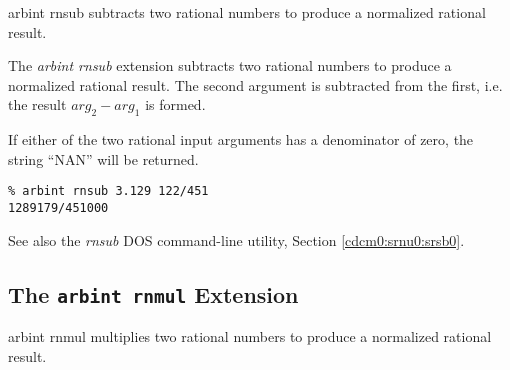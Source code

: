 \begin{tclcommandname}{arbint rnsub}%
subtracts two rational numbers to produce a normalized rational result.
\end{tclcommandname}

\begin{tclcommandsynopsis}
\end{tclcommandsynopsis}

\begin{tclcommanddescription}
The \emph{arbint rnsub} extension subtracts two rational numbers to produce a 
normalized rational result.  The second argument is subtracted from the first, i.e.
the result $arg_2 - arg_1$ is formed.

If either of the two rational input arguments has a denominator of zero,
the string ``NAN'' will be returned.
\end{tclcommanddescription}

\begin{tclcommandsampleinvocations}
\begin{scriptsize}
\begin{verbatim}
% arbint rnsub 3.129 122/451
1289179/451000
\end{verbatim}
\end{scriptsize}
\end{tclcommandsampleinvocations}

\begin{tclcommandseealso}
See also the \emph{rnsub} DOS command-line utility, 
Section \cdcmzeroxrefhyphen{}\ref{cdcm0:srnu0:srsb0}.
\end{tclcommandseealso}

\subsection{The \texttt{arbint rnmul} Extension}
\label{cxtn0:srne0:srmu0}

\begin{tclcommandname}{arbint rnmul}%
multiplies two rational numbers to produce a normalized rational result.
\end{tclcommandname}

